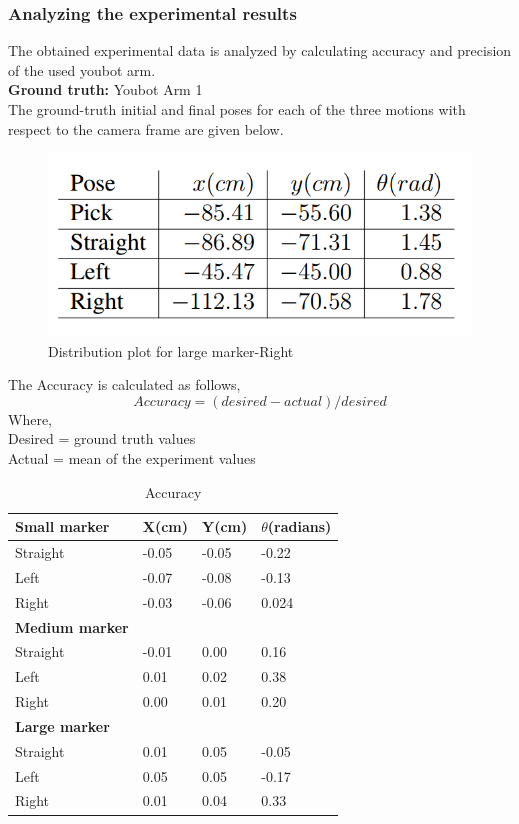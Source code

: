 \documentclass[11pt,a4paper]{article}
\begin{document}
				\subsubsection{Analyzing the experimental results} The obtained experimental data is analyzed by calculating accuracy and precision of the used youbot arm.\\
				\textbf{Ground truth:} Youbot Arm 1 \\ The ground-truth initial and final poses for each of the three motions with respect to the camera frame are given below. 
				\begin{figure}[H]
					\centering
					\includegraphics[scale=0.4]{ground-truth}
					\caption{Distribution plot for large marker-Right}	
				\end{figure}
				The Accuracy is calculated as follows,
				$$Accuracy = (desired - actual)/desired$$ 
				Where, \\
				Desired = ground truth values\\
				Actual = mean of the experiment values
				\begin{table}[h]
					\centering
					\caption{Accuracy}
					\label{accuracy}
					\begin{tabular}{|l|l|l|l|}
						\hline
						\textbf{Small marker}   & X(cm)     & Y(cm)       & $\theta$(radians) \\ \hline
						Straight                & -0.05 & -0.05 & -0.22     \\ \hline
						Left                    & -0.07 & -0.08 & -0.13     \\ \hline
						Right                   & -0.03 & -0.06 & 0.024      \\ \hline
						\textbf{Medium marker}	&  &  & \\ \hline
						Straight                & -0.01 & 0.00  & 0.16      \\ \hline
						Left                    & 0.01  & 0.02  & 0.38      \\ \hline
						Right                   & 0.00 & 0.01  & 0.20      \\ \hline
						\textbf{Large marker}	 & &       & \\ \hline
						Straight                & 0.01  & 0.05 & -0.05     \\ \hline
						Left                    & 0.05  & 0.05  & -0.17     \\ \hline
						Right                   & 0.01  & 0.04  & 0.33      \\ \hline
					\end{tabular}
				\end{table}
				\newpage
				
\end{document}
